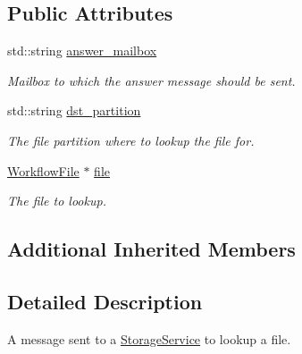 \subsection*{Public Attributes}
\begin{DoxyCompactItemize}
\item 
\mbox{\label{classwrench_1_1_storage_service_file_lookup_request_message_a84ed995c526f3e1f78841a05ace2d0ff}} 
std\+::string \hyperlink{classwrench_1_1_storage_service_file_lookup_request_message_a84ed995c526f3e1f78841a05ace2d0ff}{answer\+\_\+mailbox}
\begin{DoxyCompactList}\small\item\em Mailbox to which the answer message should be sent. \end{DoxyCompactList}\item 
\mbox{\label{classwrench_1_1_storage_service_file_lookup_request_message_a8ef342162da4740e29af692891bf47a8}} 
std\+::string \hyperlink{classwrench_1_1_storage_service_file_lookup_request_message_a8ef342162da4740e29af692891bf47a8}{dst\+\_\+partition}
\begin{DoxyCompactList}\small\item\em The file partition where to lookup the file for. \end{DoxyCompactList}\item 
\mbox{\label{classwrench_1_1_storage_service_file_lookup_request_message_ad18495c6e35aec1ae6a28edf7e0d881d}} 
\hyperlink{classwrench_1_1_workflow_file}{Workflow\+File} $\ast$ \hyperlink{classwrench_1_1_storage_service_file_lookup_request_message_ad18495c6e35aec1ae6a28edf7e0d881d}{file}
\begin{DoxyCompactList}\small\item\em The file to lookup. \end{DoxyCompactList}\end{DoxyCompactItemize}
\subsection*{Additional Inherited Members}


\subsection{Detailed Description}
A message sent to a \hyperlink{classwrench_1_1_storage_service}{Storage\+Service} to lookup a file. 

